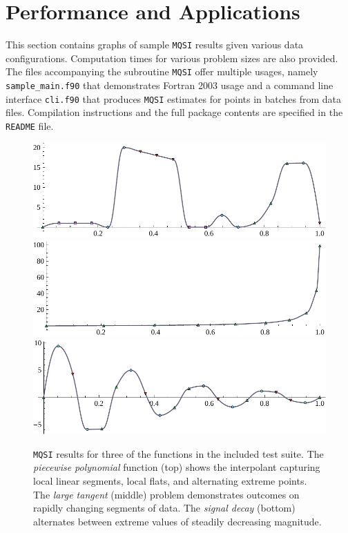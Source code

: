 \section{Performance and Applications}

This section contains graphs of sample {\tt MQSI} results given various
data configurations. Computation times for various problem sizes are also
provided. The files accompanying the subroutine {\tt MQSI} offer multiple
usages, namely {\tt sample\_main.f90} that demonstrates Fortran 2003 usage
and a command line interface {\tt cli.f90} that produces {\tt MQSI} estimates
for points in batches from data files.  Compilation instructions and the
full package contents are specified in the {\tt README} file.

\begin{figure}
  \centering
  \includegraphics[width=.7\textwidth]{Figures/TOMS/2-piecewise-polynomial.pdf}
  \includegraphics[width=.7\textwidth]{Figures/TOMS/3-large-tangent.pdf}
  \includegraphics[width=.7\textwidth]{Figures/TOMS/4-signal-decay.pdf}
\caption{{\tt MQSI} results for three of the functions in the included test
suite. The {\it piecewise polynomial} function (top) shows the
interpolant capturing local linear segments, local flats, and
alternating extreme points. The {\it large tangent} (middle)
problem demonstrates outcomes on rapidly changing segments of data.
The {\it signal decay} (bottom) alternates between extreme values
of steadily decreasing magnitude.}
\label{splines:test_funcs}
\end{figure}

